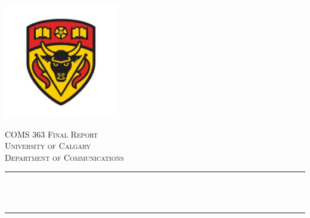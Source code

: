 \documentclass[12pt]{article}
\begin{document}
 

\begin{titlepage}

\newcommand{\HRule}{\rule{\linewidth}{0.5mm}} %

\begin{center}
\includegraphics[width=5cm]{logo}
\end{center}
 
 

\center %


\textsc{\LARGE COMS 363 Final Report}\\[1.5cm] %
\textsc{\Large University of Calgary}\\[0.5cm] %
\textsc{\large Department of Communications}\\[0.5cm] %

\makeatletter
\HRule \\[0.4cm]
{ \huge \bfseries \@title}\\[0.4cm] %
\HRule \\[1.5cm]
 


\end{titlepage}
\end{document}
